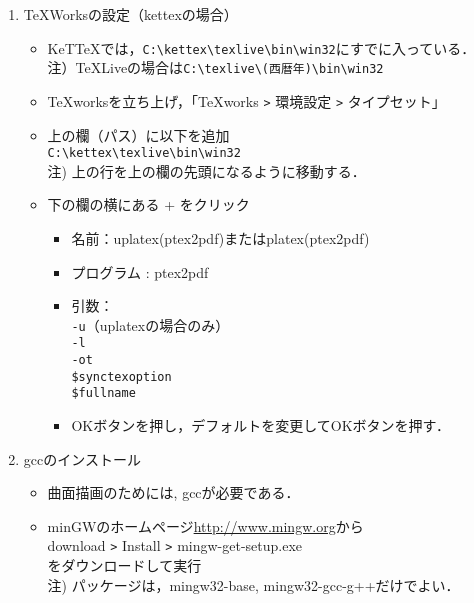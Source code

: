 \documentclass{ujarticle}
\begin{document}
\begin{enumerate}[\bf\large 1.]
\item TeXWorksの設定（kettexの場合）
  \begin{itemize}
 \item KeTTeXでは，\verb|C:\kettex\texlive\bin\win32|にすでに入っている．\\
 \hspace*{5mm}注）TeXLiveの場合は\verb|C:\texlive\(西暦年)\bin\win32|
  \item TeXworksを立ち上げ，「TeXworks \verb|>| 環境設定 \verb|>| タイプセット」
  \item 上の欄（パス）に以下を追加\\
  \hspace*{5mm}\verb|C:\kettex\texlive\bin\win32|\\
  \hspace*{10mm}注) 上の行を上の欄の先頭になるように移動する．
  \item 下の欄の横にある + をクリック
    \begin{itemize}
    \item 名前：uplatex(ptex2pdf)またはplatex(ptex2pdf)
    \item プログラム : ptex2pdf
    \item 引数：\\
    \hspace*{10mm} \verb|-u|（uplatexの場合のみ）\\
    \hspace*{10mm} \verb|-l|\\
    \hspace*{10mm} \verb|-ot|\\
    \hspace*{10mm}  \verb|$synctexoption|\\
    \hspace*{10mm}  \verb|$fullname|
    \item[]OKボタンを押し，デフォルトを変更してOKボタンを押す．
    \end{itemize}
  \end{itemize}

\item gccのインストール
  \begin{itemize}
    \item 曲面描画のためには, gccが必要である．
    \item minGWのホームページ\url{http://www.mingw.org}から\\
    \hspace*{10mm}download \verb|>| Install \verb|>| mingw-get-setup.exe\\
    をダウンロードして実行\\
    \hspace*{10mm}注) パッケージは，mingw32-base, mingw32-gcc-g++だけでよい．
  \end{itemize}


\end{enumerate}
\end{document}
